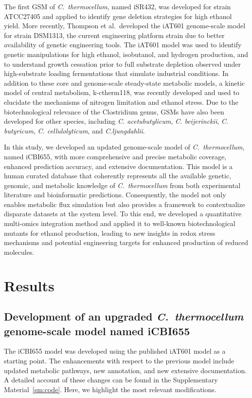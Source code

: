 The first GSM of \textit{C.~thermocellum}, named iSR432, was developed for strain ATCC27405  and applied to identify gene deletion strategies for high ethanol yield. \citep{roberts2010}
More recently, Thompson et al.\ developed the iAT601 genome-scale model \citep{thompson2016} for strain DSM1313, the current engineering platform strain due to better availability of genetic engineering tools.\citep{argyros2011}
The iAT601 model was used to identify genetic manipulations for high ethanol, isobutanol, and hydrogen production,\citep{thompson2016} and to understand growth cessation prior to full substrate depletion observed under high-substrate loading fermentations that simulate industrial conditions.\citep{thompson2017}
In addition to these core and genome-scale steady-state metabolic models, a kinetic model of central metabolism, k-ctherm118, was recently developed and used to elucidate the mechanisms of nitrogen limitation and ethanol stress.\citep{dash2017} Due to the biotechnological relevance of the Clostridium genus, GSMs have also been developed for other species,\citep{dash2016} including
\textit{C. acetubutylicum},\citep{lee2018, senger2008, salimi2010, mcanulty2012, wallenius2013, dash2014, yoo2015}
\textit{C. beijerinckii},\citep{milne2011}
\textit{C. butyricum},\citep{serrano2017}
\textit{C. cellulolyticum},\citep{salimi2010}
and \textit{C.ljungdahlii}.\citep{nagarajan2013}


In this study, we developed an updated genome-scale model of \textit{C.~thermocellum}, named iCBI655, with more comprehensive and precise metabolic coverage, enhanced prediction accuracy, and extensive documentation. This model is a human curated database that coherently represents all the available genetic, genomic, and metabolic knowledge of \textit{C.~thermocellum} from both experimental literature and bioinformatic predictions. Consequently, the model not only enables metabolic flux simulation but also provides a framework to contextualize disparate datasets at the system level. To this end, we developed a quantitative multi-omics integration method and applied it to well-known biotechnological mutants for ethanol production, leading to new insights in redox stress mechanisms and potential engineering targets for enhanced production of reduced molecules.

\section{Results}
\subsection{Development of an upgraded \textit{C.~thermocellum} genome-scale model named iCBI655}
The iCBI655 model was developed using the published iAT601 model\citep{thompson2016} as a starting point. The enhancements with respect to the previous model include updated metabolic pathways, new annotation, and new extensive documentation.
A detailed account of these changes can be found in the Supplementary Material~\ref{sm:code}. Here, we highlight the most relevant modifications.


